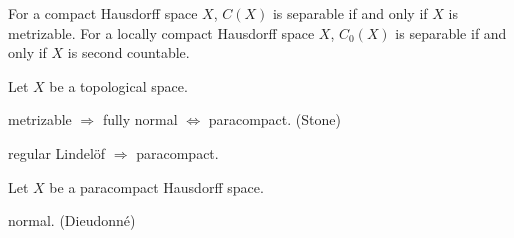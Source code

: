 \documentclass{../../large}
\begin{document}
For a compact Hausdorff space $X$, $C(X)$ is separable if and only if $X$ is metrizable.
For a locally compact Hausdorff space $X$, $C_0(X)$ is separable if and only if $X$ is second countable.


\begin{prb}
Let $X$ be a topological space.
\begin{parts}
\item metrizable $\Rightarrow$ fully normal $\Leftrightarrow$ paracompact. (Stone)
\item regular Lindel\"of $\Rightarrow$ paracompact.
\end{parts}
\end{prb}

\begin{prb}
Let $X$ be a paracompact Hausdorff space.
\begin{parts}
\item normal. (Dieudonn\'e)
\item
\end{parts}
\end{prb}
\end{document}
